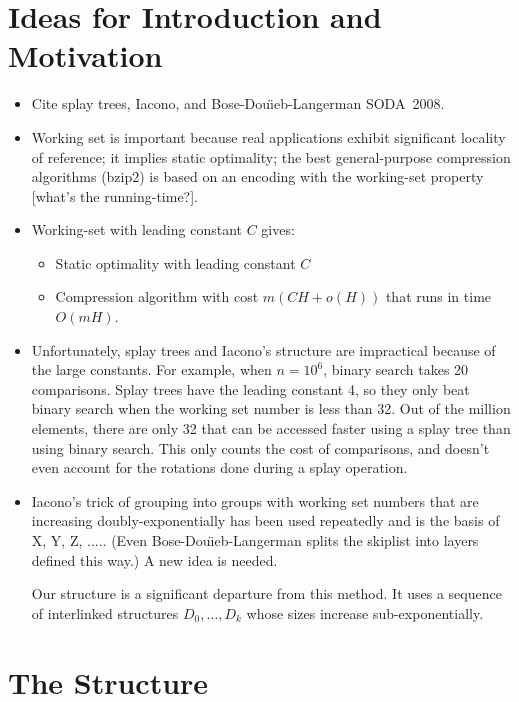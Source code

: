 \documentclass{patmorin}
\begin{document}
\section{Ideas for Introduction and Motivation}

\begin{itemize}
  \item Cite splay trees, Iacono, and Bose-Dou\"\i eb-Langerman SODA~2008.
  \item Working set is important because real applications exhibit
   significant locality of reference; it implies static optimality;
   the best general-purpose compression algorithms (bzip2) is based on
   an encoding with the working-set property [what's the running-time?].
  \item Working-set with leading constant $C$ gives:
   \begin{itemize}
     \item Static optimality with leading constant $C$
     \item Compression algorithm with cost $m(CH+o(H))$ that runs in time $O(mH)$.
   \end{itemize}
  \item Unfortunately, splay trees and Iacono's structure are impractical
   because of the large constants.  For example, when $n=10^6$, binary
   search takes 20 comparisons.  Splay trees have the leading constant 4,
   so they only beat binary search when the working set number is less
   than 32.  Out of the million elements, there are only 32 that can be
   accessed faster using a splay tree than using binary search.  This only
   counts the cost of comparisons, and doesn't even account for the rotations
   done during a splay operation.
  \item Iacono's trick of grouping into groups with working set numbers
   that are increasing doubly-exponentially has been used repeatedly and
   is the basis of X, Y, Z, ..... (Even Bose-Dou\"\i eb-Langerman splits
   the skiplist into layers defined this way.)  A new idea is needed.

   Our structure is a significant departure from this method.  It uses a 
   sequence of interlinked structures $D_0,\ldots,D_k$ whose sizes increase
   sub-exponentially.
\end{itemize}

\section{The Structure}
\end{document}
